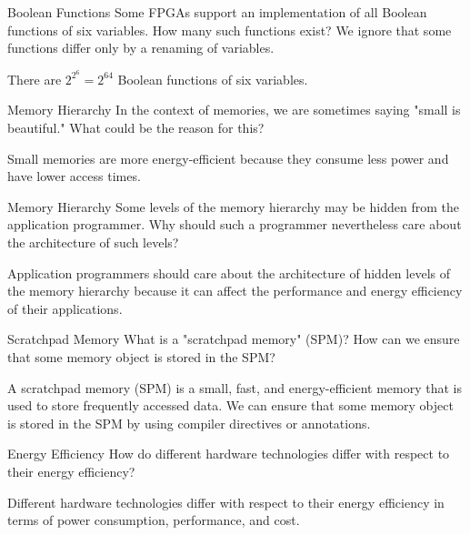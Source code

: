 \documentclass{article}
\begin{document}
\begin{exercise}{Boolean Functions}
  Some FPGAs support an implementation of all Boolean functions of six variables. How many such functions exist? We ignore that some functions differ only by a renaming of variables.

  \begin{solution}
    There are $2^{2^6} = 2^{64}$ Boolean functions of six variables.
  \end{solution}
\end{exercise}

\begin{exercise}{Memory Hierarchy}
  In the context of memories, we are sometimes saying "small is beautiful." What could be the reason for this?

  \begin{solution}
    Small memories are more energy-efficient because they consume less power and have lower access times.
  \end{solution}
\end{exercise}

\begin{exercise}{Memory Hierarchy}
  Some levels of the memory hierarchy may be hidden from the application programmer. Why should such a programmer nevertheless care about the architecture of such levels?

  \begin{solution}
    Application programmers should care about the architecture of hidden levels of the memory hierarchy because it can affect the performance and energy efficiency of their applications.
  \end{solution}
\end{exercise}

\begin{exercise}{Scratchpad Memory}
  What is a "scratchpad memory" (SPM)? How can we ensure that some memory object is stored in the SPM?

  \begin{solution}
    A scratchpad memory (SPM) is a small, fast, and energy-efficient memory that is used to store frequently accessed data. We can ensure that some memory object is stored in the SPM by using compiler directives or annotations.
  \end{solution}
\end{exercise}

\begin{exercise}{Energy Efficiency}
  How do different hardware technologies differ with respect to their energy efficiency?

  \begin{solution}
    Different hardware technologies differ with respect to their energy efficiency in terms of power consumption, performance, and cost.
  \end{solution}
\end{exercise}
\end{document}
